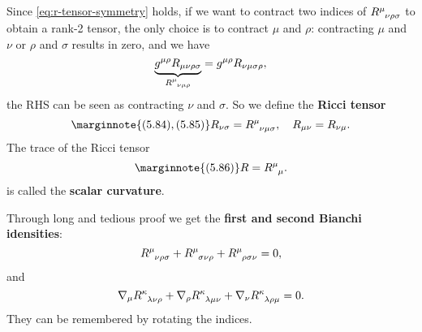 \documentclass[hyperref, a4paper]{article}
\newcommand*{\concept}[1]{{\textbf{#1}}}
\begin{document}
Since \eqref{eq:r-tensor-symmetry} holds, if we want to contract two indices of $R\indices{^\mu_{\nu \rho \sigma}}$
to obtain a rank-2 tensor, the only choice is to contract $\mu$ and $\rho$: contracting $\mu$ and $\nu$
or $\rho$ and $\sigma$ results in zero, and we have 
\[
    \underbrace{g^{\mu \rho} R_{\mu \nu \rho \sigma}}_{R\indices{^\mu_{\nu \mu \rho}}} = 
    g^{\mu \rho} R_{\nu \mu \sigma \rho} ,
\]
the RHS can be seen as contracting $\nu$ and $\sigma$. So we define the \concept{Ricci tensor}
\begin{equation} \marginnote{(5.84), (5.85)}
    R_{\nu \sigma} = R\indices{^\mu_{\nu \mu \sigma}}, \quad R_{\mu \nu} = R_{\nu \mu}.
\end{equation}
The trace of the Ricci tensor 
\begin{equation} \marginnote{(5.86)}
    R = R\indices{^\mu_\mu}.
\end{equation}
is called the \concept{scalar curvature}.

Through long and tedious proof we get the \concept{first and second Bianchi idensities}:
\begin{equation}
    R\indices{^\mu_{\nu \rho \sigma}} + R\indices{^\mu_{\sigma \nu \rho}} + R\indices{^\mu_{\rho \sigma \nu}} = 0,
\end{equation}
and 
\begin{equation}
    \nabla_\mu R\indices{^\kappa_{\lambda \nu \rho}} + \nabla_\rho R\indices{^\kappa_{\lambda \mu \nu }} + \nabla_\nu R\indices{^\kappa_{\lambda \rho \mu}} = 0.
    \label{eq:second-bianchi}
\end{equation}
They can be remembered by rotating the indices. 
\end{document}
